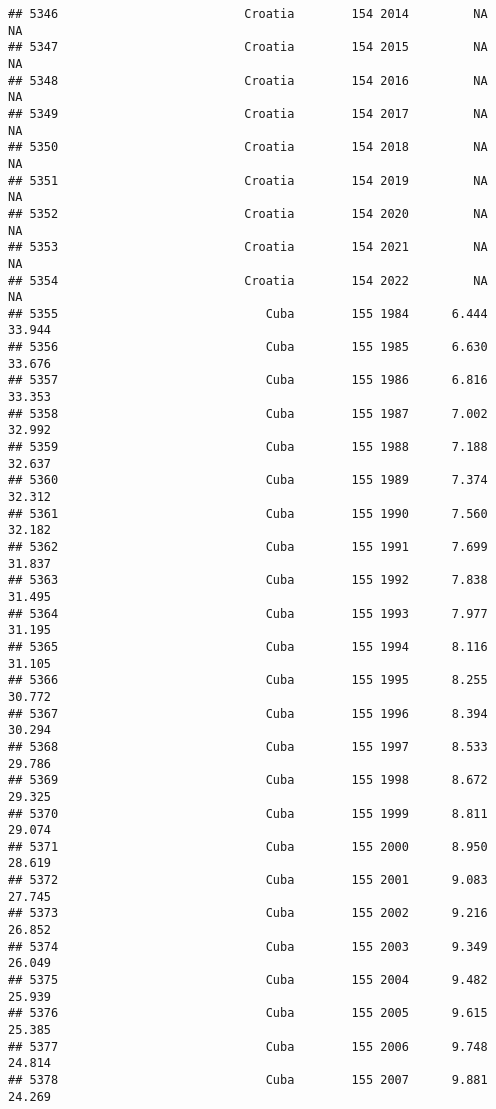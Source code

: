 \documentclass[
]{article}
\begin{document}
\begin{verbatim}
## 5346                          Croatia        154 2014         NA         NA
## 5347                          Croatia        154 2015         NA         NA
## 5348                          Croatia        154 2016         NA         NA
## 5349                          Croatia        154 2017         NA         NA
## 5350                          Croatia        154 2018         NA         NA
## 5351                          Croatia        154 2019         NA         NA
## 5352                          Croatia        154 2020         NA         NA
## 5353                          Croatia        154 2021         NA         NA
## 5354                          Croatia        154 2022         NA         NA
## 5355                             Cuba        155 1984      6.444     33.944
## 5356                             Cuba        155 1985      6.630     33.676
## 5357                             Cuba        155 1986      6.816     33.353
## 5358                             Cuba        155 1987      7.002     32.992
## 5359                             Cuba        155 1988      7.188     32.637
## 5360                             Cuba        155 1989      7.374     32.312
## 5361                             Cuba        155 1990      7.560     32.182
## 5362                             Cuba        155 1991      7.699     31.837
## 5363                             Cuba        155 1992      7.838     31.495
## 5364                             Cuba        155 1993      7.977     31.195
## 5365                             Cuba        155 1994      8.116     31.105
## 5366                             Cuba        155 1995      8.255     30.772
## 5367                             Cuba        155 1996      8.394     30.294
## 5368                             Cuba        155 1997      8.533     29.786
## 5369                             Cuba        155 1998      8.672     29.325
## 5370                             Cuba        155 1999      8.811     29.074
## 5371                             Cuba        155 2000      8.950     28.619
## 5372                             Cuba        155 2001      9.083     27.745
## 5373                             Cuba        155 2002      9.216     26.852
## 5374                             Cuba        155 2003      9.349     26.049
## 5375                             Cuba        155 2004      9.482     25.939
## 5376                             Cuba        155 2005      9.615     25.385
## 5377                             Cuba        155 2006      9.748     24.814
## 5378                             Cuba        155 2007      9.881     24.269

\end{verbatim}
\end{document}
